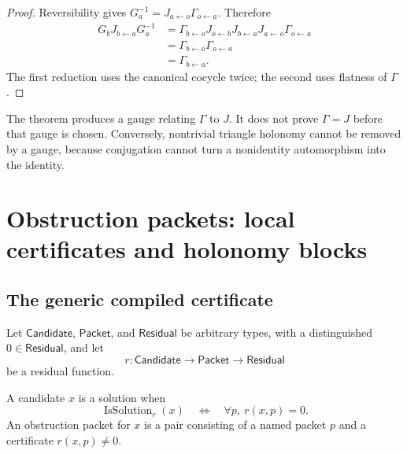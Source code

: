 \begin{proof}
Reversibility gives
$G_a^{-1}=J_{a\leftarrow o}\Gamma_{o\leftarrow a}$.  Therefore
\[
\begin{aligned}
G_bJ_{b\leftarrow a}G_a^{-1}
&=
\Gamma_{b\leftarrow o}
J_{o\leftarrow b}J_{b\leftarrow a}
J_{a\leftarrow o}
\Gamma_{o\leftarrow a}\\
&=
\Gamma_{b\leftarrow o}\Gamma_{o\leftarrow a}\\
&=
\Gamma_{b\leftarrow a}.
\end{aligned}
\]
The first reduction uses the canonical cocycle twice; the second uses
flatness of $\Gamma$.
\end{proof}

\begin{boundary}
The theorem produces a gauge relating $\Gamma$ to $J$.  It does not prove
$\Gamma=J$ before that gauge is chosen.  Conversely, nontrivial triangle
holonomy cannot be removed by a gauge, because conjugation cannot turn a
nonidentity automorphism into the identity.
\end{boundary}

\section{Obstruction packets: local certificates and holonomy blocks}
\label{sec:obstruction-packets}

\subsection{The generic compiled certificate}

Let $\mathsf{Candidate}$, $\mathsf{Packet}$, and $\mathsf{Residual}$ be
arbitrary types, with a distinguished
$0\in\mathsf{Residual}$, and let
\[
r:\mathsf{Candidate}\longrightarrow
\mathsf{Packet}\longrightarrow\mathsf{Residual}
\]
be a residual function.

\begin{definition}
\label{def:generic-obstruction}
A candidate $x$ is a solution when
\[
\operatorname{IsSolution}_r(x)
\quad\Longleftrightarrow\quad
\forall p,\ r(x,p)=0.
\]
An obstruction packet for $x$ is a pair consisting of a named packet $p$
and a certificate $r(x,p)\ne0$.
\end{definition}

